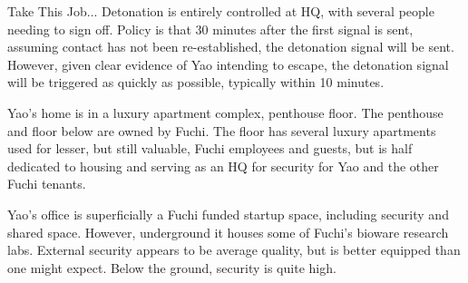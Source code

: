 \begin{scenario}{Take This Job...}
Detonation is entirely controlled at HQ, with several people needing to sign off. Policy is that 30 minutes after the first signal is sent, assuming contact has not been re-established, the detonation signal will be sent.  However, given clear evidence of Yao intending to escape, the detonation signal will be triggered as quickly as possible, typically within 10 minutes.

Yao's home is in a luxury apartment complex, penthouse floor.  The penthouse and floor below are owned by Fuchi. The floor has several luxury apartments used for lesser, but still valuable, Fuchi employees and guests, but is half dedicated to housing and serving as an HQ for security for Yao and the other Fuchi tenants.

Yao's office is superficially a Fuchi funded startup space, including security and shared space.  However, underground it houses some of Fuchi's bioware research labs.  External security appears to be average quality, but is better equipped than one might expect. Below the ground, security is quite high.

\end{scenario}

